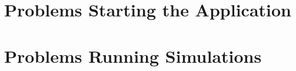 
\section{Problems Starting the Application}
\label{sec:startingProblems}



\section{Problems Running Simulations}
\label{sec:simulationProblems}





